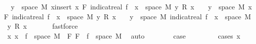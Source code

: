\begin{isabellebody}
\ {\isacharasterisk}{\kern0pt}{\isacharasterisk}{\kern0pt}{\isacharcolon}{\kern0pt}\ {\isachardoublequoteopen}{\isacharbraceleft}{\kern0pt}y\ {\isasymin}\ space\ M{\isachardot}{\kern0pt}\ {\isacharparenleft}{\kern0pt}{\isasymSum}x{\isasymin}insert\ x\ F{\isachardot}{\kern0pt}\ indicat{\isacharunderscore}{\kern0pt}real\ {\isacharparenleft}{\kern0pt}f\ {\isacharminus}{\kern0pt}{\isacharbackquote}{\kern0pt}\ {\isacharbraceleft}{\kern0pt}x{\isacharbraceright}{\kern0pt}\ {\isasyminter}\ space\ M{\isacharparenright}{\kern0pt}\ y\ {\isacharasterisk}{\kern0pt}\isactrlsub R\ x{\isacharparenright}{\kern0pt}\ {\isasymnoteq}\ {}{\isacharbraceright}{\kern0pt}\ {\isasymsubseteq}\ {\isacharbraceleft}{\kern0pt}y\ {\isasymin}\ space\ M{\isachardot}{\kern0pt}\ {\isacharparenleft}{\kern0pt}{\isasymSum}x{\isasymin}F{\isachardot}{\kern0pt}\ indicat{\isacharunderscore}{\kern0pt}real\ {\isacharparenleft}{\kern0pt}f\ {\isacharminus}{\kern0pt}{\isacharbackquote}{\kern0pt}\ {\isacharbraceleft}{\kern0pt}x{\isacharbraceright}{\kern0pt}\ {\isasyminter}\ space\ M{\isacharparenright}{\kern0pt}\ y\ {\isacharasterisk}{\kern0pt}\isactrlsub R\ x{\isacharparenright}{\kern0pt}\ {\isasymnoteq}\ {}{\isacharbraceright}{\kern0pt}\ {\isasymunion}\ {\isacharbraceleft}{\kern0pt}y\ {\isasymin}\ space\ M{\isachardot}{\kern0pt}\ indicat{\isacharunderscore}{\kern0pt}real\ {\isacharparenleft}{\kern0pt}f\ {\isacharminus}{\kern0pt}{\isacharbackquote}{\kern0pt}\ {\isacharbraceleft}{\kern0pt}x{\isacharbraceright}{\kern0pt}\ {\isasyminter}\ space\ M{\isacharparenright}{\kern0pt}\ y\ {\isacharasterisk}{\kern0pt}\isactrlsub R\ x\ {\isasymnoteq}\ {}{\isacharbraceright}{\kern0pt}{\isachardoublequoteclose}\ \isamarkupfalse%
\ {\isacharasterisk}{\kern0pt}\ \isamarkupfalse%
\ fastforce\ \ \ \ \isanewline
\ \ \ \ \isacommand{{\isacharbraceleft}{\kern0pt}}\isamarkupfalse%
\isanewline
\ \ \ \ \ \ \isamarkupfalse%
\ {}\isanewline
\ \ \ \ \ \ \isamarkupfalse%
\ x{\isacharcolon}{\kern0pt}\ {\isachardoublequoteopen}x\ {\isasymin}\ f\ {\isacharbackquote}{\kern0pt}\ space\ M{\isachardoublequoteclose}\ \ F{\isacharcolon}{\kern0pt}\ {\isachardoublequoteopen}F\ {\isasymsubseteq}\ f\ {\isacharbackquote}{\kern0pt}\ space\ M{\isachardoublequoteclose}\ \isamarkupfalse%
\ auto\isanewline
\ \ \ \ \ \ \isamarkupfalse%
\ {\isacharquery}{\kern0pt}case\ \isanewline
\ \ \ \ \ \ \isamarkupfalse%
\ {\isacharparenleft}{\kern0pt}cases\ {\isachardoublequoteopen}x\ {\isacharequal}{\kern0pt}\ {}{\isachardoublequoteclose}{\isacharparenright}{\kern0pt}\isanewline

\end{isabellebody}
